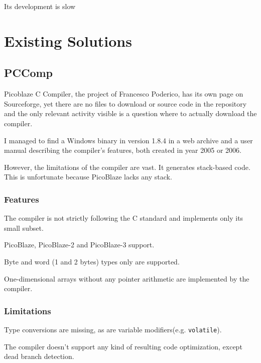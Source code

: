 
    Its development is slow

\chapter{Existing Solutions}\label{existing}

    \section{PCComp}\label{pccomp}

    Picoblaze C Compiler, the project of Francesco Poderico, has its own page on Sourceforge, %
    yet there are no files to download or source code in the repository and the only relevant activity visible is a question where to actually download the compiler.

    I managed to find a Windows binary in version 1.8.4 in a web archive and a user manual describing the compiler's features, both created in year 2005 or 2006.

    However, the limitations of the compiler are vast. It generates stack-based code. This is unfortunate because PicoBlaze lacks any stack. 

        \subsection{Features}

        The compiler is not strictly following the C standard and implements only its small subset.

        PicoBlaze, PicoBlaze-2 and PicoBlaze-3 support.

        Byte and word (1 and 2 bytes) types only are supported.

        One-dimensional arrays without any pointer arithmetic are implemented by the compiler.

        \subsection{Limitations}

        Type conversions are missing, as are variable modifiers(e.g. \texttt{volatile}). 

        The compiler doesn't support any kind of resulting code optimization, except dead branch detection.

